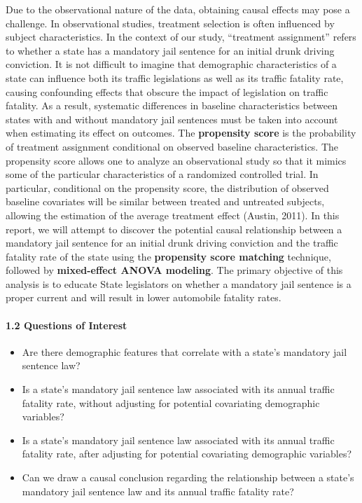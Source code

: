 \documentclass[]{article}
\providecommand{\tightlist}{%
  \setlength{\itemsep}{0pt}\setlength{\parskip}{0pt}}
\let\oldparagraph\paragraph
\renewcommand{\paragraph}[1]{\oldparagraph{#1}\mbox{}}
\begin{document}
Due to the observational nature of the data, obtaining causal effects may pose a challenge. In observational studies, treatment selection is often influenced by subject characteristics. In the context of our study, ``treatment assignment'' refers to whether a state has a mandatory jail sentence for an initial drunk driving conviction. It is not difficult to imagine that demographic characteristics of a state can influence both its traffic legislations as well as its traffic fatality rate, causing confounding effects that obscure the impact of legislation on traffic fatality. As a result, systematic differences in baseline characteristics between states with and without mandatory jail sentences must be taken into account when estimating its effect on outcomes. The \textbf{propensity score} is the probability of treatment assignment conditional on observed baseline characteristics. The propensity score allows one to analyze an observational study so that it mimics some of the particular characteristics of a randomized controlled trial. In particular, conditional on the propensity score, the distribution of observed baseline covariates will be similar between treated and untreated subjects, allowing the estimation of the average treatment effect (Austin, 2011). In this report, we will attempt to discover the potential causal relationship between a mandatory jail sentence for an initial drunk driving conviction and the traffic fatality rate of the state using the \textbf{propensity score matching} technique, followed by \textbf{mixed-effect ANOVA modeling}. The primary objective of this analysis is to educate State legislators on whether a mandatory jail sentence is a proper current and will result in lower automobile fatality rates.

\hypertarget{questions-of-interest}{%
\paragraph{1.2 Questions of Interest}\label{questions-of-interest}}

\begin{itemize}
\tightlist
\item
  Are there demographic features that correlate with a state's mandatory jail sentence law?\\
\item
  Is a state's mandatory jail sentence law associated with its annual traffic fatality rate, without adjusting for potential covariating demographic variables?\\
\item
  Is a state's mandatory jail sentence law associated with its annual traffic fatality rate, after adjusting for potential covariating demographic variables?\\
\item
  Can we draw a causal conclusion regarding the relationship between a state's mandatory jail sentence law and its annual traffic fatality rate?
\end{itemize}
\end{document}
